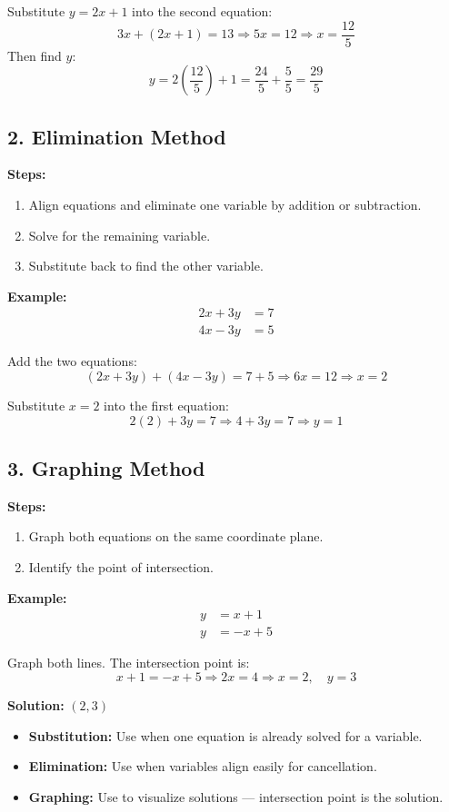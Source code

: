 \documentclass[11pt]{article}
\begin{document}
Substitute \( y = 2x + 1 \) into the second equation:
\[
3x + (2x + 1) = 13 \Rightarrow 5x = 12 \Rightarrow x = \frac{12}{5}
\]
Then find \( y \):
\[
y = 2\left(\frac{12}{5}\right) + 1 = \frac{24}{5} + \frac{5}{5} = \frac{29}{5}
\]

\subsection{2. Elimination Method}

\textbf{Steps:}
\begin{enumerate}
  \item Align equations and eliminate one variable by addition or subtraction.
  \item Solve for the remaining variable.
  \item Substitute back to find the other variable.
\end{enumerate}

\textbf{Example:}
\[
\begin{aligned}
2x + 3y &= 7 \\
4x - 3y &= 5
\end{aligned}
\]

Add the two equations:
\[
(2x + 3y) + (4x - 3y) = 7 + 5 \Rightarrow 6x = 12 \Rightarrow x = 2
\]

Substitute \( x = 2 \) into the first equation:
\[
2(2) + 3y = 7 \Rightarrow 4 + 3y = 7 \Rightarrow y = 1
\]

\subsection{3. Graphing Method}

\textbf{Steps:}
\begin{enumerate}
  \item Graph both equations on the same coordinate plane.
  \item Identify the point of intersection.
\end{enumerate}

\textbf{Example:}
\[
\begin{aligned}
y &= x + 1 \\
y &= -x + 5
\end{aligned}
\]

Graph both lines. The intersection point is:
\[
x + 1 = -x + 5 \Rightarrow 2x = 4 \Rightarrow x = 2, \quad y = 3
\]

\textbf{Solution: } \( (2, 3) \)

\begin{tcolorbox}[colback=blue!5!white, colframe=blue!80!black, title=System of Equations Summary]
\begin{itemize}
  \item \textbf{Substitution:} Use when one equation is already solved for a variable.
  \item \textbf{Elimination:} Use when variables align easily for cancellation.
  \item \textbf{Graphing:} Use to visualize solutions — intersection point is the solution.
\end{itemize}
\end{tcolorbox}
\end{document}
